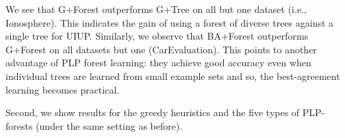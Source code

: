 
We see that G+Forest outperforms G+Tree on all but one
dataset (i.e., Ionosphere). This indicates the gain of using a forest of 
diverse trees against a single tree for UIUP.
Similarly, we observe that BA+Forest outperforms G+Forest on all
datasets but one (CarEvaluation). This points to another advantage of PLP forest
learning: they achieve good accuracy even when individual trees are learned
from small example sets and so, the best-agreement learning becomes practical.

Second, we show results for the greedy heuristics and the five types of 
PLP-forests (under the same setting as before).

